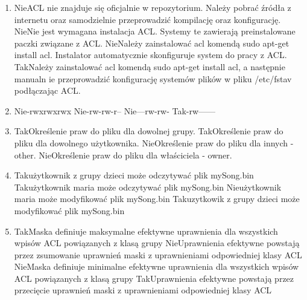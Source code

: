 \begin{enumerate}
	\newpage
	
	\item {}
	{Nie}{ACL nie znajduje się oficjalnie w repozytorium. Należy pobrać źródła z internetu oraz samodzielnie przeprowadzić kompilację oraz konfigurację.}
	{Nie}{Nie jest wymagana instalacja ACL. Systemy te zawierają preinstalowane paczki związane z ACL.}
	{Nie}{Należy zainstalować acl komendą sudo apt-get install acl. Instalator automatycznie skonfiguruje system do pracy z ACL.}
	{Tak}{Należy zainstalować acl komendą sudo apt-get install acl, a następnie manualn ie przeprowadzić konfigurację systemów plików w pliku /etc/fstav podłączając ACL.}
	
	\item {}
	{Nie}{-rwxrwxrwx}
	{Nie}{-rw-rw-r--}
	{Nie}{---rw-rw-}
	{Tak}{-rw------}
	
	\item {}
	{Tak}{Określenie praw do pliku dla dowolnej grupy.}
	{Tak}{Określenie praw do pliku dla dowolnego użytkownika.}
	{Nie}{Określenie praw do pliku dla innych - other.}
	{Nie}{Określenie praw do pliku dla właściciela - owner.}
	
	\item {}
	{Tak}{użytkownik z grupy dzieci może odczytywać plik mySong.bin}
	{Tak}{użytkownik maria może odczytywać plik mySong.bin}
	{Nie}{użytkownik maria może modyfikować plik mySong.bin}
	{Tak}{uzytkowik z grupy dzieci może modyfikować plik mySong.bin}
	
	\newpage
	
	\item {}
	{Tak}{Maska definiuje maksymalne efektywne uprawnienia dla wszystkich wpisów ACL powiązanych z klasą grupy}
	{Nie}{Uprawnienia efektywne powstają przez zsumowanie uprawnień maski z uprawnieniami odpowiedniej klasy ACL}
	{Nie}{Maska definiuje minimalne efektywne uprawnienia dla wszystkich wpisów ACL powiązanych z klasą grupy}
	{Tak}{Uprawnienia efektywne powstają przez przecięcie uprawnień maski z uprawnieniami odpowiedniej klasy ACL}


\end{enumerate}
